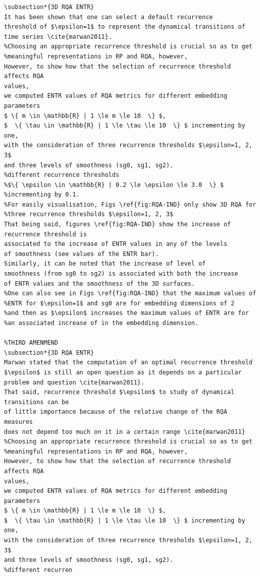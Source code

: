 \documentclass[10pt]{article}
\begin{document}
\begin{enumerate}
\begin{verbatim}
\subsection*{3D RQA ENTR}
It has been shown that one can select a default recurrence 
threshold of $\epsilon=1$ to represent the dynamical transitions of 
time series \cite{marwan2011}.
%Choosing an appropriate recurrence threshold is crucial so as to get 
%meaningful representations in RP and RQA, however, 
However, to show how that the selection of recurrence threshold affects RQA
values, 
we computed ENTR values of RQA metrics for different embedding parameters
$ \{ m \in \mathbb{R} | 1 \le m \le 10  \} $,
$  \{ \tau \in \mathbb{R} | 1 \le \tau \le 10  \} $ incrementing by one,
with the consideration of three recurrence thresholds $\epsilon=1, 2, 3$ 
and three levels of smoothness (sg0, sg1, sg2). 
%different recurrence thresholds 
%$\{ \epsilon \in \mathbb{R} | 0.2 \le \epsilon \le 3.0  \} $
%incrementing by 0.1.
%For easily visualisation, Figs \ref{fig:RQA-IND} only show 3D RQA for 
%three recurrence thresholds $\epsilon=1, 2, 3$ 
That being said, figures \ref{fig:RQA-IND} show the increase of recurrence threshold is 
associated to the increase of ENTR values in any of the levels 
of smoothness (see values of the ENTR bar).
Similarly, it can be noted that the increase of level of 
smoothness (from sg0 to sg2) is associated with both the increase 
of ENTR values and the smoothness of the 3D surfaces.
%One can also see in Figs \ref{fig:RQA-IND} that the maximum values of 
%ENTR for $\epsilon=1$ and sg0 are for embedding dimensions of 2 
%and then as $\epsilon$ increases the maximum values of ENTR are for
%an associated increase of in the embedding dimension.

%THIRD AMENMEND
\subsection*{3D RQA ENTR}
Marwan stated that the computation of an optimal recurrence threshold
$\epsilon$ is still an open question as it depends on a particular problem and question \cite{marwan2011}.
That said, recurrence threshold $\epsilon$ to study of dynamical transitions can be 
of little importance because of the relative change of the RQA measures 
does not depend too much on it in a certain range \cite{marwan2011}
%Choosing an appropriate recurrence threshold is crucial so as to get 
%meaningful representations in RP and RQA, however, 
However, to show how that the selection of recurrence threshold affects RQA
values, 
we computed ENTR values of RQA metrics for different embedding parameters
$ \{ m \in \mathbb{R} | 1 \le m \le 10  \} $,
$  \{ \tau \in \mathbb{R} | 1 \le \tau \le 10  \} $ incrementing by one,
with the consideration of three recurrence thresholds $\epsilon=1, 2, 3$ 
and three levels of smoothness (sg0, sg1, sg2). 
%different recurren




\end{verbatim}
\end{enumerate}
\end{document}
